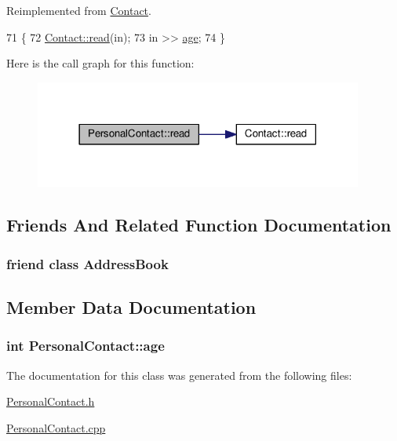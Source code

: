 Reimplemented from \hyperlink{classContact_a129d7132ff55adf52737ca7e364d6420}{Contact}.


\begin{DoxyCode}
71 \{
72    \hyperlink{classContact_a129d7132ff55adf52737ca7e364d6420}{Contact::read}(in);
73    in >> \hyperlink{classPersonalContact_a5608489f547f4d3fbe57069463862e42}{age};
74 \}
\end{DoxyCode}


Here is the call graph for this function\+:
\nopagebreak
\begin{figure}[H]
\begin{center}
\leavevmode
\includegraphics[width=306pt]{classPersonalContact_a10eedd89e14f19b8ad1f7fa938f15747_cgraph}
\end{center}
\end{figure}




\subsection{Friends And Related Function Documentation}
\subsubsection[{\texorpdfstring{Address\+Book}{AddressBook}}]{\setlength{\rightskip}{0pt plus 5cm}friend class {\bf Address\+Book}\hspace{0.3cm}{\ttfamily [friend]}}\hypertarget{classPersonalContact_a196c2536dfbd98b40c60736c4ca095d2}{}\label{classPersonalContact_a196c2536dfbd98b40c60736c4ca095d2}


\subsection{Member Data Documentation}
\subsubsection[{\texorpdfstring{age}{age}}]{\setlength{\rightskip}{0pt plus 5cm}int Personal\+Contact\+::age\hspace{0.3cm}{\ttfamily [protected]}}\hypertarget{classPersonalContact_a5608489f547f4d3fbe57069463862e42}{}\label{classPersonalContact_a5608489f547f4d3fbe57069463862e42}


The documentation for this class was generated from the following files\+:\begin{DoxyCompactItemize}
\item 
\hyperlink{PersonalContact_8h}{Personal\+Contact.\+h}\item 
\hyperlink{PersonalContact_8cpp}{Personal\+Contact.\+cpp}\end{DoxyCompactItemize}
